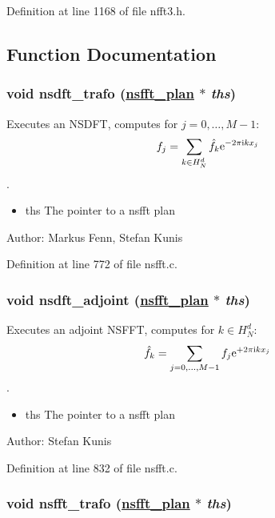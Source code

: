 Definition at line 1168 of file nfft3.h.

\subsection{Function Documentation}
\hypertarget{group__nsfft_ga0}{
\subsubsection[nsdft\_\-trafo]{\setlength{\rightskip}{0pt plus 5cm}void nsdft\_\-trafo (\hyperlink{structnsfft__plan}{nsfft\_\-plan} $\ast$ {\em ths})}}
\label{group__nsfft_ga0}


Executes an NSDFT, computes for $j=0,\hdots,M-1$: \[ f_j = \sum_{k\in H_N^d}\hat f_k {\rm e}^{-2\pi{\rm\scriptsize i}k x_j} \]. 

\begin{itemize}
\item ths The pointer to a nsfft plan\end{itemize}
\begin{Desc}
\item[Author:]Markus Fenn, Stefan Kunis \end{Desc}


Definition at line 772 of file nsfft.c.\hypertarget{group__nsfft_ga1}{
\subsubsection[nsdft\_\-adjoint]{\setlength{\rightskip}{0pt plus 5cm}void nsdft\_\-adjoint (\hyperlink{structnsfft__plan}{nsfft\_\-plan} $\ast$ {\em ths})}}
\label{group__nsfft_ga1}


Executes an adjoint NSFFT, computes for $k\in H_N^d$: \[ \hat f_k = \sum_{j=0,\hdots,M-1} f_j {\rm e}^{+2\pi{\rm\scriptsize i}k x_j} \]. 

\begin{itemize}
\item ths The pointer to a nsfft plan\end{itemize}
\begin{Desc}
\item[Author:]Stefan Kunis \end{Desc}


Definition at line 832 of file nsfft.c.\hypertarget{group__nsfft_ga2}{
\subsubsection[nsfft\_\-trafo]{\setlength{\rightskip}{0pt plus 5cm}void nsfft\_\-trafo (\hyperlink{structnsfft__plan}{nsfft\_\-plan} $\ast$ {\em ths})}}
\label{group__nsfft_ga2}


